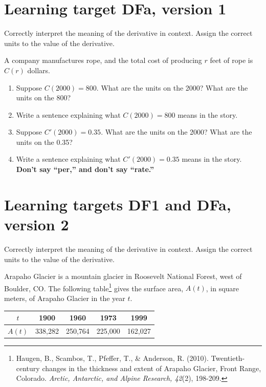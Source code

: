 
\usepackage{pgfplots}



\section{Learning target DFa, version 1}

Correctly interpret the meaning of the derivative in context. Assign the correct units to the value of the derivative.

\hrulefill

A company manufactures rope, and the total cost of producing $r$ feet of rope is $C(r)$ dollars.
\begin{enumerate}[leftmargin=0pt]
    \item Suppose $C(2000) = 800$. What are the units on the 2000? What are the units on the 800?
    \vfill
    \item Write a sentence explaining what $C(2000) = 800$ means in the story.
    \vfill
    \item Suppose $C'(2000) = 0.35$. What are the units on the 2000? What are the units on the 0.35?
    \vfill
    \item Write a sentence explaining what $C'(2000) = 0.35$ means in the story. \\
    \textbf{Don't say ``per,'' and don't say ``rate.''}
    \vfill
\end{enumerate}


\pagebreak

\section{Learning targets DF1 and DFa, version 2}

Correctly interpret the meaning of the derivative in context. Assign the correct units to the value of the derivative.

\hrulefill

Arapaho Glacier is a mountain glacier in Roosevelt National Forest,
west of Boulder, CO. The following table\footnote{
Haugen, B., Scambos, T., Pfeffer, T., \& Anderson, R. (2010). Twentieth-century changes in the thickness and extent of Arapaho Glacier, Front Range, Colorado. \textit{Arctic, Antarctic, and Alpine Research, 42}(2), 198-209.}
gives the surface area, $A(t)$, in square meters, of Arapaho Glacier in the year $t$. 
\begin{center}
	\begin{tabular}{|c|c|c|c|c|}
	\hline
	$t$ & 1900 & 1960 & 1973 & 1999\\
	\hline
	$A(t)$ & 338,282 & 250,764 & 225,000 & 162,027\\
	\hline
	\end{tabular}
 \end{center}
	
